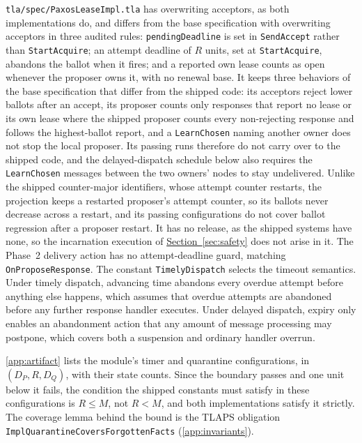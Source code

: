 \documentclass[final,5p,times,twocolumn,number]{elsarticle}
\newcommand{\code}[1]{\texttt{#1}}
\newcommand{\secref}[1]{\hyperref[#1]{Section~\ref*{#1}}}
\begin{document}
\code{tla/spec/PaxosLeaseImpl.tla} has overwriting acceptors, as both implementations do, and differs from the base specification with overwriting acceptors in three audited rules: \code{pendingDeadline} is set in \code{SendAccept} rather than \code{StartAcquire}; an attempt deadline of $R$ units, set at \code{StartAcquire}, abandons the ballot when it fires; and a reported own lease counts as open whenever the proposer owns it, with no renewal base.  It keeps three behaviors of the base specification that differ from the shipped code: its acceptors reject lower ballots after an accept, its proposer counts only responses that report no lease or its own lease where the shipped proposer counts every non-rejecting response and follows the highest-ballot report, and a \code{LearnChosen} naming another owner does not stop the local proposer.  Its passing runs therefore do not carry over to the shipped code, and the delayed-dispatch schedule below also requires the \code{LearnChosen} messages between the two owners' nodes to stay undelivered.  Unlike the shipped counter-major identifiers, whose attempt counter restarts, the projection keeps a restarted proposer's attempt counter, so its ballots never decrease across a restart, and its passing configurations do not cover ballot regression after a proposer restart.  It has no release, as the shipped systems have none, so the incarnation execution of \secref{sec:safety} does not arise in it.  The Phase~2 delivery action has no attempt-deadline guard, matching \code{OnProposeResponse}.  The constant \code{TimelyDispatch} selects the timeout semantics.  Under timely dispatch, advancing time abandons every overdue attempt before anything else happens, which assumes that overdue attempts are abandoned before any further response handler executes.  Under delayed dispatch, expiry only enables an abandonment action that any amount of message processing may postpone, which covers both a suspension and ordinary handler overrun.

\ref{app:artifact} lists the module's timer and quarantine configurations, in $(D_P, R, D_Q)$, with their state counts.  Since the boundary passes and one unit below it fails, the condition the shipped constants must satisfy in these configurations is $R \leq M$, not $R < M$, and both implementations satisfy it strictly.  The coverage lemma behind the bound is the TLAPS obligation \code{ImplQuarantineCoversForgottenFacts} (\ref{app:invariants}).
\end{document}
